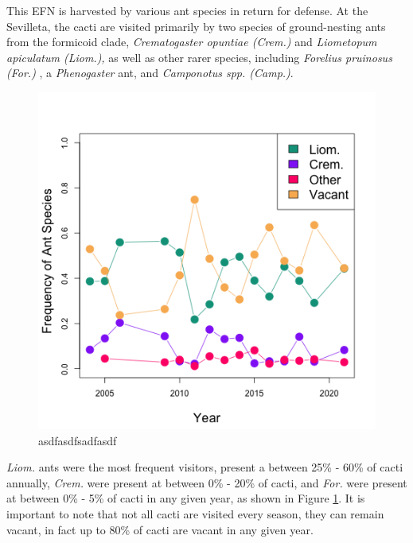 \documentclass[12pt,a4paper]{article}
\begin{document}
This EFN is harvested by various ant species in return for defense. 
At the Sevilleta, the cacti are visited primarily by two species of ground-nesting ants from the formicoid clade, \textit{Crematogaster opuntiae (Crem.) } and \textit{Liometopum apiculatum (Liom.), } as well as other rarer species, including \textit{Forelius pruinosus (For.) }, a \textit{Phenogaster} ant, and \textit{Camponotus spp. (Camp.)}.

\begin{figure}[h]
	\includegraphics[width=\linewidth]{Timeseries.png}
	\caption{asdfasdfsadfasdf}
	\label{fig:timeseries}
\end{figure}


\textit{Liom.} ants were the most frequent visitors, present a  between 25\% - 60\% of cacti annually, \textit{Crem.} were present at between 0\% - 20\% of cacti, and \textit{For.} were present at between 0\% - 5\% of cacti in any given year, as shown in Figure \ref{fig:timeseries}. 
It is important to note that not all cacti are visited every season, they can remain vacant, in fact up to 80\% of cacti are vacant in any given year. 
\end{document}
